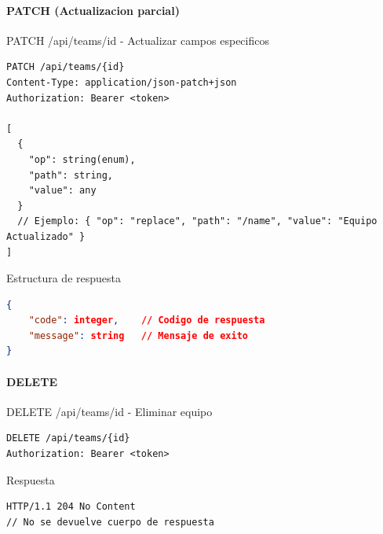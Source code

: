 \documentclass[11pt,a4paper]{article}
\begin{document}
\paragraph{PATCH (Actualizacion parcial)}

\begin{center}
	\begin{minipage}{\textwidth}
		\begin{codebox}{PATCH /api/teams/{id} - Actualizar campos especificos}
			\begin{lstlisting}[language=HTTP]
PATCH /api/teams/{id}
Content-Type: application/json-patch+json
Authorization: Bearer <token>

[
  {
    "op": string(enum), 
    "path": string, 
    "value": any 
  }
  // Ejemplo: { "op": "replace", "path": "/name", "value": "Equipo Actualizado" }
]
\end{lstlisting}
		\end{codebox}
	\end{minipage}
\end{center}

\begin{center}
	\begin{minipage}{\textwidth}
		\begin{codebox}{Estructura de respuesta}
			\begin{lstlisting}[language=json]
{
    "code": integer,    // Codigo de respuesta
    "message": string   // Mensaje de exito
}
\end{lstlisting}
		\end{codebox}
	\end{minipage}
\end{center}

\paragraph{DELETE}

\begin{center}
	\begin{minipage}{\textwidth}
		\begin{codebox}{DELETE /api/teams/{id} - Eliminar equipo}
			\begin{lstlisting}[language=HTTP]
DELETE /api/teams/{id}
Authorization: Bearer <token>
\end{lstlisting}
		\end{codebox}
	\end{minipage}
\end{center}

\begin{center}
	\begin{minipage}{\textwidth}
		\begin{codebox}{Respuesta}
			\begin{lstlisting}[language=HTTP]
HTTP/1.1 204 No Content
// No se devuelve cuerpo de respuesta
\end{lstlisting}
		\end{codebox}
	\end{minipage}
\end{center}
\end{document}
